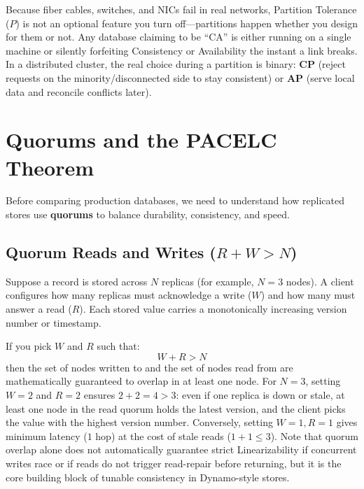 \begin{productionwarningbox}
Because fiber cables, switches, and NICs fail in real networks, Partition Tolerance ($P$) is not an optional feature you turn off---partitions happen whether you design for them or not. Any database claiming to be ``CA'' is either running on a single machine or silently forfeiting Consistency or Availability the instant a link breaks. In a distributed cluster, the real choice during a partition is binary: \textbf{CP} (reject requests on the minority/disconnected side to stay consistent) or \textbf{AP} (serve local data and reconcile conflicts later).
\end{productionwarningbox}

\section{Quorums and the PACELC Theorem}

Before comparing production databases, we need to understand how replicated stores use \textbf{quorums} to balance durability, consistency, and speed.

\subsection{Quorum Reads and Writes ($R + W > N$)}

Suppose a record is stored across $N$ replicas (for example, $N = 3$ nodes). A client configures how many replicas must acknowledge a write ($W$) and how many must answer a read ($R$). Each stored value carries a monotonically increasing version number or timestamp.

If you pick $W$ and $R$ such that:
\begin{equation}
W + R > N
\end{equation}
then the set of nodes written to and the set of nodes read from are mathematically guaranteed to overlap in at least one node. For $N=3$, setting $W=2$ and $R=2$ ensures $2 + 2 = 4 > 3$: even if one replica is down or stale, at least one node in the read quorum holds the latest version, and the client picks the value with the highest version number. Conversely, setting $W=1, R=1$ gives minimum latency ($1$ hop) at the cost of stale reads ($1+1 \le 3$). Note that quorum overlap alone does not automatically guarantee strict Linearizability if concurrent writes race or if reads do not trigger read-repair before returning, but it is the core building block of tunable consistency in Dynamo-style stores.

